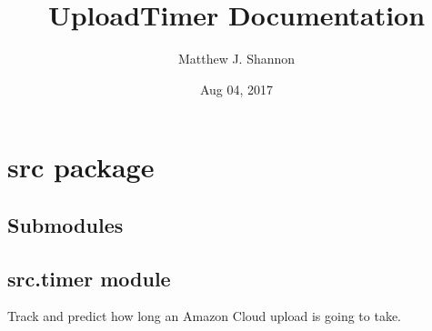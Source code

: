 \documentclass[letterpaper,10pt,english]{sphinxmanual}
\title{UploadTimer Documentation}
\date{Aug 04, 2017}
\author{Matthew J. Shannon}
\begin{document}
\maketitle
\sphinxtableofcontents
{}\label{\detokenize{index::doc}}



\chapter{src package}
\label{\detokenize{src::doc}}\label{\detokenize{src:src-package}}\label{\detokenize{src:welcome-to-uploadtimer-s-documentation}}

\section{Submodules}
\label{\detokenize{src:submodules}}

\section{src.timer module}
\label{\detokenize{src:module-src.timer}}\label{\detokenize{src:src-timer-module}}
Track and predict how long an Amazon Cloud upload is going to take.
\end{document}
